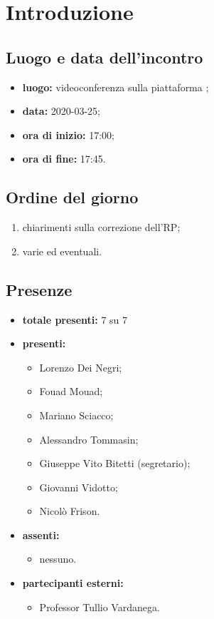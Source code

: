 \section*{Introduzione}

\subsection*{Luogo e data dell'incontro}
	\begin{itemize}
		\item \textbf{luogo:} videoconferenza sulla piattaforma ;
		\item \textbf{data:} 2020-03-25;
		\item \textbf{ora di inizio:} 17:00;
		\item \textbf{ora di fine:} 17:45.
	\end{itemize}

\subsection*{Ordine del giorno}
	\begin{enumerate}
			\item chiarimenti sulla correzione dell'RP;
  		\item varie ed eventuali.
	\end{enumerate}

\subsection*{Presenze}
	\begin{itemize}
		\item \textbf{totale presenti:} 7 su 7
		\item \textbf{presenti: }
			\begin{itemize}
				\item Lorenzo Dei Negri;
				\item Fouad Mouad;
				\item Mariano Sciacco;
				\item Alessandro Tommasin;
				\item Giuseppe Vito Bitetti (segretario);
				\item Giovanni Vidotto;
				\item Nicolò Frison.
			\end{itemize}
		\item \textbf{assenti: }
			\begin{itemize}
				\item nessuno.
			\end{itemize}
		\item  \textbf{partecipanti esterni:}
			\begin{itemize}
				\item Professor Tullio Vardanega.
			\end{itemize}
	\end{itemize}


